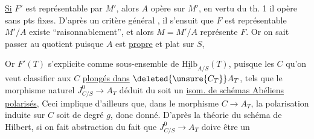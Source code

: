 

\uline{Si} $F'$ est représentable par  $M'$, alors $A$ opère sur $M'$, en vertu du th. 1 il opère sans pts fixes.  D'après un critère général , il s'ensuit que $F$ est représentable  $M'/A$ existe ``raisonnablement'', et alors $M=M'/A$ représente $F$. Or on sait passer au quotient puisque $A$ est \uline{propre} et plat sur $S$,

Or $F'(T)$ s'explicite comme sous-ensemble de $\underline{\mathrm{Hilb}}_{A/S}(T)$, puisque les $C$ qu'on veut classifier  aux $C$ \uline{plongés dans} $\deleted{\unsure{C_T}}A_T$, tels que le morphisme naturel $J^0_{C/S}\longrightarrow A_T$ déduit du  soit un \uline{isom. de schémas Abéliens polarisés},   Ceci implique d'ailleurs que, dans le morphisme $C\longrightarrow A_T$,  la polarisation induite sur $C$ soit de degré $g$, donc donné. D'après la théorie du schéma de Hilbert, si on fait abstraction du fait que $J^0_{C/S}\to A_T$ doive être un

